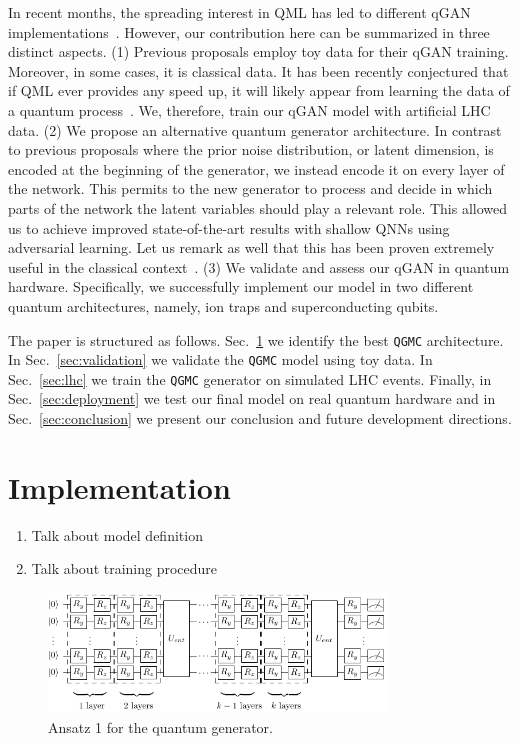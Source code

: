 \documentclass[twocolumn,preprintnumbers,superscriptaddress]{revtex4-2}
\begin{document}
In recent months, the spreading interest in QML has led to different qGAN implementations~\cite{zoufal2019quantum, zeng2019learning, situ2020quantum, hu2019quantum, benedetti2019adversarial, romero2021variational, niu2021entangling}. However, our contribution here can be summarized in three distinct aspects. (1) Previous proposals employ toy data for their qGAN training. Moreover, in some cases, it is classical data. It has been recently conjectured that if QML ever provides any speed up, it will likely appear from learning the data of a quantum process~\cite{huang2021information, kubler2021inductive}. We, therefore, train our qGAN model with artificial LHC data. (2) We propose an alternative quantum generator architecture. In contrast to previous proposals where the prior noise distribution, or latent dimension, is encoded at the beginning of the generator, we instead encode it on every layer of the network. This permits to the new generator to process and decide in which parts of the network the latent variables should play a relevant role. This allowed us to achieve improved state-of-the-art results with shallow QNNs using adversarial learning. Let us remark as well that this has been proven extremely useful in the classical context~\cite{karras2019style}. (3) We validate and assess our qGAN in quantum hardware. Specifically, we successfully implement our model in two different quantum architectures, namely, ion traps and superconducting qubits.

The paper is structured as follows. Sec.~\ref{sec:implementation} we identify
the best {\tt QGMC} architecture. In Sec.~\ref{sec:validation} we validate the
{\tt QGMC} model using toy data. In Sec.~\ref{sec:lhc} we train the {\tt QGMC}
generator on simulated LHC events. Finally, in Sec.~\ref{sec:deployment} we test
our final model on real quantum hardware and in Sec.~\ref{sec:conclusion} we
present our conclusion and future development directions.

\section{Implementation}
\label{sec:implementation}

\begin{enumerate}
  \item Talk about model definition
  \item Talk about training procedure
\end{enumerate}

\begin{figure}
  \includegraphics[width=0.8\textwidth]{plots/ansatz1.pdf}
  \caption{\label{fig:circuit}Ansatz 1 for the quantum generator.}
\end{figure}
\end{document}
